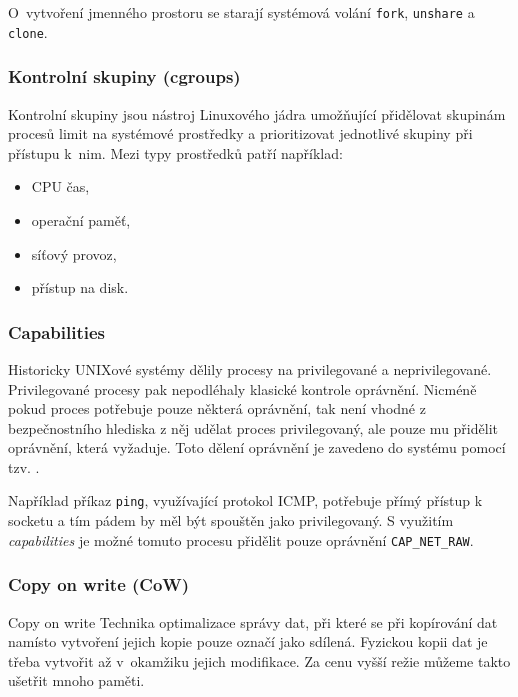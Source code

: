 
O~vytvoření jmenného prostoru se starají systémová volání \verb|fork|, \verb|unshare| a \verb|clone|.

\subsubsection{Kontrolní skupiny (cgroups)}

Kontrolní skupiny jsou nástroj Linuxového jádra umožňující přidělovat skupinám procesů limit na systémové prostředky a prioritizovat jednotlivé skupiny při přístupu k~nim.
Mezi typy prostředků patří například:

\begin{itemize}
	\item CPU čas,
	\item operační paměť,
	\item síťový provoz,
	\item přístup na disk.
\end{itemize} %

\subsubsection{Capabilities}

Historicky UNIXové systémy dělily procesy na privilegované a neprivilegované.
Privilegované procesy pak nepodléhaly klasické kontrole oprávnění.
Nicméně pokud proces potřebuje pouze některá oprávnění, tak není vhodné z bezpečnostního hlediska z něj udělat proces privilegovaný, ale pouze mu přidělit oprávnění, která vyžaduje.
Toto dělení oprávnění je zavedeno do systému pomocí tzv. .

Například příkaz \verb|ping|, využívající protokol ICMP, potřebuje přímý přístup k socketu a tím pádem by měl být spouštěn jako privilegovaný.
S využitím \textit{capabilities} je možné tomuto procesu přidělit pouze oprávnění \verb|CAP_NET_RAW|.


\subsubsection{Copy on write (CoW)}

Copy on write\cite{copy_on_write} Technika optimalizace správy dat, při které se při kopírování dat namísto vytvoření jejich kopie pouze označí jako sdílená.
Fyzickou kopii dat je třeba vytvořit až v~okamžiku jejich modifikace.
Za cenu vyšší režie můžeme takto ušetřit mnoho paměti.

